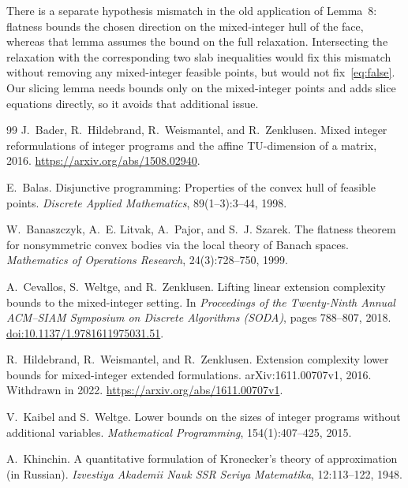 \documentclass[11pt]{article}
\theoremstyle{definition}
\begin{document}
There is a separate hypothesis mismatch in the old application of Lemma~8:
flatness bounds the chosen direction on the mixed-integer hull of the face,
whereas that lemma assumes the bound on the full relaxation. Intersecting the
relaxation with the corresponding two slab inequalities would fix this
mismatch without removing any mixed-integer feasible points, but would not
fix~\eqref{eq:false}. Our slicing lemma needs bounds only on the
mixed-integer points and adds slice equations directly, so it avoids that
additional issue.

\begin{thebibliography}{99}
J.~Bader, R.~Hildebrand, R.~Weismantel, and R.~Zenklusen.
\newblock Mixed integer reformulations of integer programs and the affine
{TU}-dimension of a matrix, 2016.
\newblock \url{https://arxiv.org/abs/1508.02940}.

E.~Balas.
\newblock Disjunctive programming: Properties of the convex hull of feasible points.
\newblock \emph{Discrete Applied Mathematics}, 89(1--3):3--44, 1998.

W.~Banaszczyk, A.~E. Litvak, A.~Pajor, and S.~J. Szarek.
\newblock The flatness theorem for nonsymmetric convex bodies via the local
theory of Banach spaces.
\newblock \emph{Mathematics of Operations Research}, 24(3):728--750, 1999.

A.~Cevallos, S.~Weltge, and R.~Zenklusen.
\newblock Lifting linear extension complexity bounds to the mixed-integer setting.
\newblock In \emph{Proceedings of the Twenty-Ninth Annual ACM--SIAM Symposium
on Discrete Algorithms (SODA)}, pages 788--807, 2018.
\newblock \href{https://doi.org/10.1137/1.9781611975031.51}{doi:10.1137/1.9781611975031.51}.

R.~Hildebrand, R.~Weismantel, and R.~Zenklusen.
\newblock Extension complexity lower bounds for mixed-integer extended formulations.
\newblock arXiv:1611.00707v1, 2016. Withdrawn in 2022.
\newblock \url{https://arxiv.org/abs/1611.00707v1}.

V.~Kaibel and S.~Weltge.
\newblock Lower bounds on the sizes of integer programs without additional variables.
\newblock \emph{Mathematical Programming}, 154(1):407--425, 2015.

A.~Khinchin.
\newblock A quantitative formulation of Kronecker's theory of approximation
(in Russian).
\newblock \emph{Izvestiya Akademii Nauk SSR Seriya Matematika}, 12:113--122, 1948.


\end{thebibliography}
\end{document}
